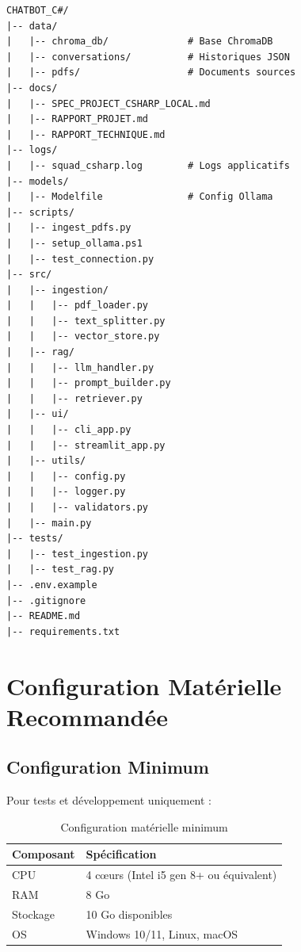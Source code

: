 \documentclass[12pt,a4paper]{report}
\begin{document}
\begin{lstlisting}[basicstyle=\ttfamily\footnotesize, numbers=none]
CHATBOT_C#/
|-- data/
|   |-- chroma_db/              # Base ChromaDB
|   |-- conversations/          # Historiques JSON
|   |-- pdfs/                   # Documents sources
|-- docs/
|   |-- SPEC_PROJECT_CSHARP_LOCAL.md
|   |-- RAPPORT_PROJET.md
|   |-- RAPPORT_TECHNIQUE.md
|-- logs/
|   |-- squad_csharp.log        # Logs applicatifs
|-- models/
|   |-- Modelfile               # Config Ollama
|-- scripts/
|   |-- ingest_pdfs.py
|   |-- setup_ollama.ps1
|   |-- test_connection.py
|-- src/
|   |-- ingestion/
|   |   |-- pdf_loader.py
|   |   |-- text_splitter.py
|   |   |-- vector_store.py
|   |-- rag/
|   |   |-- llm_handler.py
|   |   |-- prompt_builder.py
|   |   |-- retriever.py
|   |-- ui/
|   |   |-- cli_app.py
|   |   |-- streamlit_app.py
|   |-- utils/
|   |   |-- config.py
|   |   |-- logger.py
|   |   |-- validators.py
|   |-- main.py
|-- tests/
|   |-- test_ingestion.py
|   |-- test_rag.py
|-- .env.example
|-- .gitignore
|-- README.md
|-- requirements.txt
\end{lstlisting}

\chapter{Configuration Matérielle Recommandée}

\section{Configuration Minimum}

Pour tests et développement uniquement :

\begin{table}[H]
    \centering
    \renewcommand{\arraystretch}{1.3}
    \begin{tabular}{|l|l|}
        \hline
        \rowcolor{green!20}
        \textbf{Composant} & \textbf{Spécification} \\
        \hline
        CPU & 4 cœurs (Intel i5 gen 8+ ou équivalent) \\
        \hline
        RAM & 8 Go \\
        \hline
        Stockage & 10 Go disponibles \\
        \hline
        OS & Windows 10/11, Linux, macOS \\
        \hline
    \end{tabular}
    \caption{Configuration matérielle minimum}
\end{table}
\end{document}
